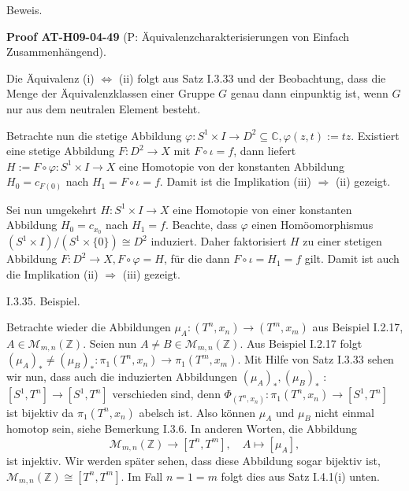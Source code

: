 \documentclass[10pt, letterpaper]{article}
\newcommand{\CustomHeading}[3]{%
  \par\medskip\noindent%
  \textbf{#1 #2} \textnormal{(#3)}.\enskip%
}
\newenvironment{PROOF}[2]{\begin{unitbox}\CustomHeading{Proof}{#1}{#2}}{\end{unitbox}}
\begin{document}
Beweis. 

\begin{PROOF}{AT-H09-04-49}{P: Äquivalenzcharakterisierungen von Einfach Zusammenhängend}
Die Äquivalenz (i) $\Leftrightarrow$ (ii) folgt aus Satz I.3.33 und der Beobachtung, dass die Menge der Äquivalenzklassen einer Gruppe $G$ genau dann einpunktig ist, wenn $G$ nur aus dem neutralen Element besteht. 

Betrachte nun die stetige Abbildung $\varphi: S^1 \times I \rightarrow D^2 \subseteq \mathbb{C}, \varphi(z, t):=t z$. Existiert eine stetige Abbildung $F: D^2 \rightarrow X$ mit $F \circ \iota=f$, dann liefert $H:=F \circ \varphi: S^1 \times I \rightarrow X$ eine Homotopie von der konstanten Abbildung $H_0=c_{F(0)}$ nach $H_1=F \circ \iota=f$. Damit ist die Implikation (iii) $\Rightarrow$ (ii) gezeigt. 

Sei nun umgekehrt $H: S^1 \times I \rightarrow X$ eine Homotopie von einer konstanten Abbildung $H_0=c_{x_0}$ nach $H_1=f$. Beachte, dass $\varphi$ einen Homöomorphismus $\left(S^1 \times I\right) /\left(S^1 \times\{0\}\right) \cong D^2$ induziert. Daher faktorisiert $H$ zu einer stetigen Abbildung $F: D^2 \rightarrow X, F \circ \varphi=H$, für die dann $F \circ \iota=H_1=f$ gilt. Damit ist auch die Implikation (ii) $\Rightarrow$ (iii) gezeigt.
\end{PROOF}




I.3.35. Beispiel. 

Betrachte wieder die Abbildungen $\mu_A:\left(T^n, x_n\right) \rightarrow\left(T^m, x_m\right)$ aus Beispiel I.2.17, $A \in \mathcal{M}_{m, n}(\mathbb{Z})$. Seien nun $A \neq B \in \mathcal{M}_{m, n}(\mathbb{Z})$. Aus 
Beispiel I.2.17 folgt $\left(\mu_A\right)_* \neq\left(\mu_B\right)_*: \pi_1\left(T^n, x_n\right) \rightarrow \pi_1\left(T^m, x_m\right)$. Mit Hilfe von Satz I.3.33 sehen wir nun, dass auch die induzierten Abbildungen $\left(\mu_A\right)_*,\left(\mu_B\right)_*$ : $\left[S^1, T^n\right] \rightarrow\left[S^1, T^n\right]$ verschieden sind, denn $\Phi_{\left(T^n, x_n\right)}: \pi_1\left(T^n, x_n\right) \rightarrow\left[S^1, T^n\right]$ ist bijektiv da $\pi_1\left(T^n, x_n\right)$ abelsch ist. Also können $\mu_A$ und $\mu_B$ nicht einmal homotop sein, siehe Bemerkung I.3.6. In anderen Worten, die Abbildung
$$
\mathcal{M}_{m, n}(\mathbb{Z}) \rightarrow\left[T^n, T^m\right], \quad A \mapsto\left[\mu_A\right],
$$
ist injektiv. Wir werden später sehen, dass diese Abbildung sogar bijektiv ist, $\mathcal{M}_{m, n}(\mathbb{Z}) \cong\left[T^n, T^m\right]$. Im Fall $n=1=m$ folgt dies aus Satz I.4.1(i) unten.
\end{document}
